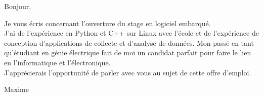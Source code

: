 \documentclass[12pt,french]{letter}
\begin{document}

\begin{letter}{}
\address{Montréal, Canada}

\opening{Bonjour,}


Je vous écris concernant l'ouverture du stage en logiciel embarqué.
\\J'ai de l'expérience en Python et C++ sur Linux avec l'école et de l'expérience de conception d'applications de collecte et d'analyse de données. Mon passé en tant qu'étudiant en génie électrique fait de moi un candidat parfait pour faire le lien en l'informatique et l'électronique.
\\J'apprécierais l'opportunité de parler avec vous au sujet de cette offre d'emploi.

\closing{Maxime}


\end{letter}
\end{document}
